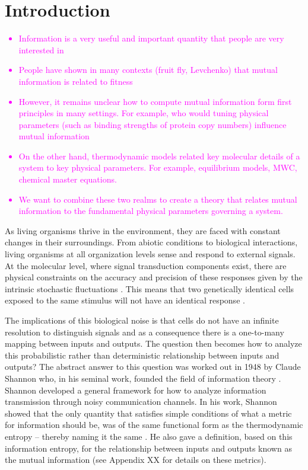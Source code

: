 \section{Introduction}

\textcolor{magenta}{
\begin{itemize}
	\item Information is a very useful and important quantity that people are very interested in
	\item People have shown in many contexts (fruit fly, Levchenko) that mutual information is related to fitness
	\item However, it remains unclear how to compute mutual information form first principles in many settings. For example, who would tuning physical parameters (such as binding strengths of protein copy numbers) influence mutual information
	\item On the other hand, thermodynamic models related key molecular details of a system to key physical parameters. For example, equilibrium models, MWC, chemical master equations.
	\item We want to combine these two realms to create a theory that relates mutual information to the fundamental physical parameters governing a system.
\end{itemize}
}

As living organisms thrive in the environment, they are faced with constant
changes in their surroundings. From abiotic conditions to biological
interactions, living organisms at all organization levels sense and respond to
external signals. At the molecular level, where signal transduction components
exist, there are physical constraints on the accuracy and precision of these
responses given by the intrinsic stochastic fluctuations  \cite{Nemenman2010}.
This means that two genetically identical cells exposed to the same stimulus
will not have an identical response \cite{Eldar2010}.

The implications of this biological noise is that cells do not have an infinite
resolution to distinguish signals and as a consequence there is a one-to-many
mapping between inputs and outputs. The question then becomes how to analyze
this probabilistic rather than deterministic relationship between inputs and
outputs? The abstract answer to this question was worked out in 1948 by Claude
Shannon who, in his seminal work, founded the field of information theory
\cite{Shannon1948}. Shannon developed a general framework for how to analyze
information transmission through noisy communication channels. In his work,
Shannon showed that the only quantity that satisfies simple conditions of what a
metric for information should be, was of the same functional form as the
thermodynamic entropy -- thereby naming it the same \cite{MacKay2003}. He also
gave a definition, based on this information entropy, for the relationship
between inputs and outputs known as the mutual information (see Appendix XX for
details on these metrics). 

